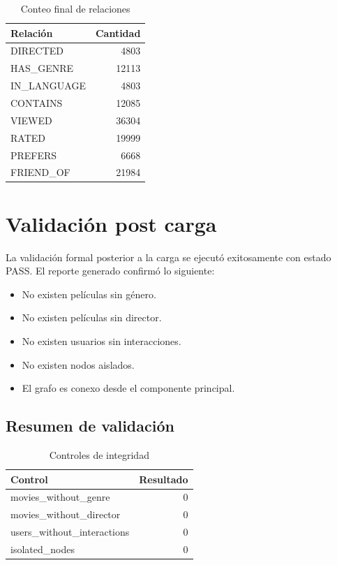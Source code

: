 \documentclass[12pt,a4paper]{article}
\begin{document}
\begin{table}[H]
\centering
\begin{tabular}{lr}
\toprule
\textbf{Relación} & \textbf{Cantidad} \\
\midrule
DIRECTED & 4803 \\
HAS\_GENRE & 12113 \\
IN\_LANGUAGE & 4803 \\
CONTAINS & 12085 \\
VIEWED & 36304 \\
RATED & 19999 \\
PREFERS & 6668 \\
FRIEND\_OF & 21984 \\
\bottomrule
\end{tabular}
\caption{Conteo final de relaciones}
\end{table}

\section{Validación post carga}

La validación formal posterior a la carga se ejecutó exitosamente con estado PASS. El reporte generado confirmó lo siguiente:

\begin{itemize}
    \item No existen películas sin género.
    \item No existen películas sin director.
    \item No existen usuarios sin interacciones.
    \item No existen nodos aislados.
    \item El grafo es conexo desde el componente principal.
\end{itemize}

\subsection{Resumen de validación}

\begin{table}[H]
\centering
\begin{tabular}{lr}
\toprule
\textbf{Control} & \textbf{Resultado} \\
\midrule
movies\_without\_genre & 0 \\
movies\_without\_director & 0 \\
users\_without\_interactions & 0 \\
isolated\_nodes & 0 \\
\bottomrule
\end{tabular}
\caption{Controles de integridad}
\end{table}
\end{document}

